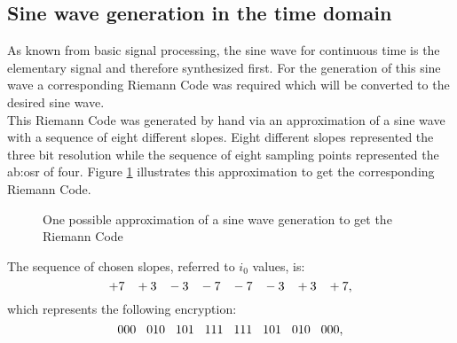 \subsection{Sine wave generation in the time domain}
As known from basic signal processing, the sine wave for continuous time is the elementary signal and therefore synthesized first. 
For the generation of this sine wave a corresponding Riemann Code was required which will be converted to the desired sine wave.\\
This Riemann Code was generated by hand via an approximation of a sine wave with a sequence of eight different slopes.
Eight different slopes represented the three bit resolution while the sequence of eight sampling points represented the \gls{ab:osr} of four. 
Figure \ref{fig:RiemannCodeGenerationSineWave} illustrates this approximation to get the corresponding Riemann Code.



\begin{figure}[htb!]
   \centering 
   
   \caption{One possible approximation of a sine wave generation to get the Riemann Code}
   \label{fig:RiemannCodeGenerationSineWave}
\end{figure}


The sequence of chosen slopes, referred to $i_0$ values, is:
\begin{equation}
 +7\hspace{.3cm} +3\hspace{.3cm} -3\hspace{.3cm} -7\hspace{.3cm} -7\hspace{.3cm} -3\hspace{.3cm} +3\hspace{.3cm} +7,
 \end{equation} 
which represents the following encryption:
\begin{equation}
000\hspace{.3cm} 010\hspace{.3cm} 101\hspace{.3cm} 111\hspace{.3cm} 111\hspace{.3cm} 101\hspace{.3cm} 010\hspace{.3cm} 000,
\label{eq:RiemannCodeSineWave} 
\end{equation}

